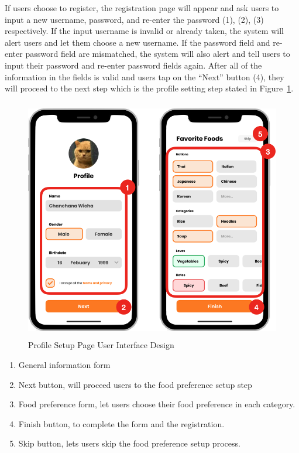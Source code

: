 \documentclass[12pt,oneside,openright,a4paper]{cpe-english-project}
\begin{document}
If users choose to register, the registration page will appear and ask users to input a new username, password, and re-enter the password (1), (2), (3) respectively. If the input username is invalid or already taken, the system will alert users and let them choose a new username. If the password field and re-enter password field are mismatched, the system will also alert and tell users to input their password and re-enter password fields again. After all of the information in the fields is valid and users tap on the “Next” button (4), they will proceed to the next step which is the profile setting step stated in Figure~\ref{fig:3ui_ProfileSetupPageUserInterfaceDesign}.

\newpage
\begin{figure}[H]\centering
\includegraphics[height=300pt]{./images/3ui_ProfileSetupPageUserInterfaceDesign.png}
\caption{Profile Setup Page User Interface Design}\label{fig:3ui_ProfileSetupPageUserInterfaceDesign}
\end{figure}

\begin{enumerate}
\item General information form
\item Next button, will proceed users to the food preference setup step
\item Food preference form, let users choose their food preference in each category.
\item Finish button, to complete the form and the registration.
\item Skip button, lets users skip the food preference setup process.
\end{enumerate}
\end{document}

